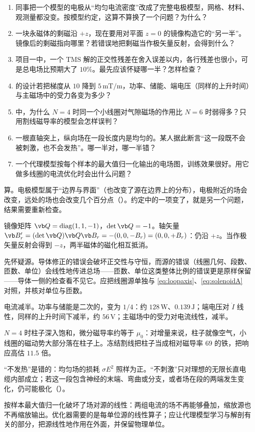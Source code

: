 \begin{selfcheck}
\begin{enumerate}
\item 同事把一个模型的电极从“均匀电流密度”改成了完整电极模型，网格、材料、观测量都没变。按模型约定，这算不算换了一个问题？为什么？
\item 一块永磁体的剩磁沿 $+z$，现在要用对平面 $z=0$ 的镜像构造它的“另一半”。镜像后的剩磁指向哪里？若错误地把剩磁当作极矢量反射，会得到什么？
\item 项目一中，一个 TMS 解的正交性残差在舍入误差以内，各行残差也很小，可是总电场比预期大了 $10\%$。最先应该怀疑哪一半？怎样检查？
\item {} 的设计若把梯度从 $10$ 降到 $5\,\mathrm{mT/m}$，功率、储能、端电压（同样的上升时间）与主磁场中的受力各变为多少？
\item {} 中，为什么 $N=4$ 时同一个小线圈对气隙磁场的作用比 $N=6$ 时弱得多？只用割线磁导率的模型会怎样误判？
\item 一根直轴突上，纵向场在一段长度内是均匀的。某人据此断言“这一段既不会被刺激，也不会发热”。哪一半对，哪一半错？
\item 一个代理模型按每个样本的最大值归一化输出的电场图，训练效果很好。用它做多线圈的电流优化时会出什么问题？
\end{enumerate}
\end{selfcheck}

\begin{answers}
\item 算。电极模型属于“边界与界面”（也改变了源在边界上的分布），电极附近的场会改变，远处的场也会改变几个百分点（）。约定中的一项变了，就是另一个问题，结果需要重新检查。
\item 镜像矩阵 $\vb Q=\mathrm{diag}(1,1,-1)$，$\det\vb Q=-1$。轴矢量 $\vb B_r'=(\det\vb Q)\vb Q\vb B_r=-(0,0,-B_r)=(0,0,+B_r)$：仍沿 $+z$。当作极矢量反射会得到 $-z$，两半磁体的磁化相互抵消。
\item 先怀疑源。导体修正的错误会破坏正交性与守恒，而源的错误（线圈几何、段数、匝数、单位）会线性地传进总场——匝数、单位这类整体比例的错误更是原样保留——导体一侧的检查看不见它。应把线圈源单独与 \eqref{eq:loopaxis}、\eqref{eq:solenoidA} 对照，并核对单位与匝数。
\item 电流减半。功率与储能是二次的，变为 $1/4$：约 $128\,\mathrm W$、$0.139\,\mathrm J$；端电压对 $\dot I$ 线性，同样的上升时间下减半，约 $56\,\mathrm V$；主磁场中的受力对电流线性，减半。
\item $N=4$ 时柱子深入饱和，微分磁导率约等于 $\mu_0$：对增量来说，柱子就像空气，小线圈的磁动势大部分落在柱子上。冻结割线把柱子当成相对磁导率 $69$ 的铁，把响应高估 $11.5$ 倍。
\item “不发热”是错的：均匀场的损耗 $\sigma E^2$ 照样为正。“不刺激”只对理想的无限长直电缆内部成立；若这一段包含神经的末端、弯曲或分支，或者场在段的两端发生变化，仍可能极化（）。
\item 按样本最大值归一化破坏了场对源的线性：两组电流的场不再能够叠加，缩放源也不再缩放输出。优化器需要的是每单位源的线性算子；应让代理模型学习与解剖有关的部分，把源线性地作用在外面，并保留物理单位。
\end{answers}
